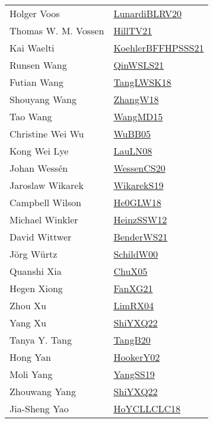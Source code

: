 {\begin{longtable}{p{4cm}p{20cm}}
Holger Voos & \href{articles/LunardiBLRV20.pdf}{LunardiBLRV20}\cite{LunardiBLRV20} \\
Thomas W. M. Vossen & \href{papers/HillTV21.pdf}{HillTV21}\cite{HillTV21} \\
Kai Waelti & \href{articles/KoehlerBFFHPSSS21.pdf}{KoehlerBFFHPSSS21}\cite{KoehlerBFFHPSSS21} \\
Runsen Wang & \href{articles/QinWSLS21.pdf}{QinWSLS21}\cite{QinWSLS21} \\
Futian Wang & \href{}{TangLWSK18}\cite{TangLWSK18} \\
Shouyang Wang & \href{articles/ZhangW18.pdf}{ZhangW18}\cite{ZhangW18} \\
Tao Wang & \href{articles/WangMD15.pdf}{WangMD15}\cite{WangMD15} \\
Christine Wei Wu & \href{papers/WuBB05.pdf}{WuBB05}\cite{WuBB05} \\
Kong Wei Lye & \href{papers/LauLN08.pdf}{LauLN08}\cite{LauLN08} \\
Johan Wess{\'{e}}n & \href{papers/WessenCS20.pdf}{WessenCS20}\cite{WessenCS20} \\
Jaroslaw Wikarek & \href{articles/WikarekS19.pdf}{WikarekS19}\cite{WikarekS19} \\
Campbell Wilson & \href{papers/He0GLW18.pdf}{He0GLW18}\cite{He0GLW18} \\
Michael Winkler & \href{articles/HeinzSSW12.pdf}{HeinzSSW12}\cite{HeinzSSW12} \\
David Wittwer & \href{papers/BenderWS21.pdf}{BenderWS21}\cite{BenderWS21} \\
J{\"{o}}rg W{\"{u}}rtz & \href{articles/SchildW00.pdf}{SchildW00}\cite{SchildW00} \\
Quanshi Xia & \href{papers/ChuX05.pdf}{ChuX05}\cite{ChuX05} \\
Hegen Xiong & \href{articles/FanXG21.pdf}{FanXG21}\cite{FanXG21} \\
Zhou Xu & \href{papers/LimRX04.pdf}{LimRX04}\cite{LimRX04} \\
Yang Xu & \href{}{ShiYXQ22}\cite{ShiYXQ22} \\
Tanya Y. Tang & \href{papers/TangB20.pdf}{TangB20}\cite{TangB20} \\
Hong Yan & \href{papers/HookerY02.pdf}{HookerY02}\cite{HookerY02} \\
Moli Yang & \href{papers/YangSS19.pdf}{YangSS19}\cite{YangSS19} \\
Zhouwang Yang & \href{}{ShiYXQ22}\cite{ShiYXQ22} \\
Jia{-}Sheng Yao & \href{papers/HoYCLLCLC18.pdf}{HoYCLLCLC18}\cite{HoYCLLCLC18} \\

\end{longtable}}

